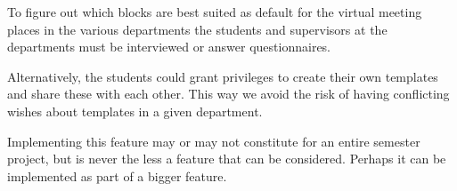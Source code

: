 To figure out which blocks are best suited as default for the virtual meeting places in the various departments the students and supervisors at the departments must be interviewed or answer questionnaires.

Alternatively, the students could grant privileges to create their own templates and share these with each other.
This way we avoid the risk of having conflicting wishes about templates in a given department.

Implementing this feature may or may not constitute for an entire semester project, but is never the less a feature that can be considered.
Perhaps it can be implemented as part of a bigger feature.